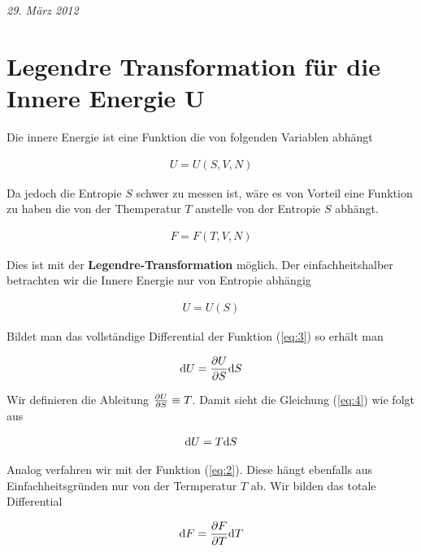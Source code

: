 
\usepackage{amsmath} 






\textit{29. März 2012}


\section*{Legendre Transformation für die Innere Energie U}


Die innere Energie ist eine Funktion die von folgenden Variablen abhängt

\begin{align}
  \label{eq:1}
  U=U(S,V,N)
\end{align}

Da jedoch die Entropie \(S\) schwer zu messen ist, wäre es von Vorteil eine Funktion zu haben die von der Themperatur \(T\) anstelle von der Entropie \(S\) abhängt.

\begin{align}
  \label{eq:2}
  F=F(T,V,N)
\end{align}

Dies ist mit der \textbf{Legendre-Transformation} möglich. Der einfachheitshalber betrachten wir die Innere Energie nur von Entropie abhängig

\begin{align}
  \label{eq:3}
  U = U(S) 
\end{align}

Bildet man das vollständige Differential der Funktion (\ref{eq:3}) so erhält man

\begin{align}
  \label{eq:4}
  \diff U = \pdiff U_S \diff S
\end{align}

Wir definieren die Ableitung \(\pdiff U_S\equiv T\). Damit sieht die Gleichung (\ref{eq:4}) wie folgt aus

\begin{align}
  \label{eq:5}
  \diff U = T \diff S
\end{align}

Analog verfahren wir mit der Funktion (\ref{eq:2}). Diese hängt ebenfalls aus Einfachheitsgründen nur von der Termperatur \(T\) ab. Wir bilden das totale Differential

\begin{align}
  \label{eq:6}
  \diff F = \pdiff F_T \diff T
\end{align}

